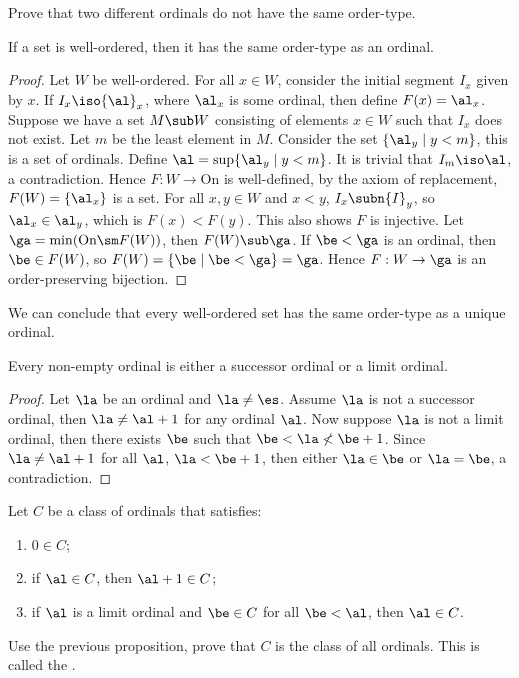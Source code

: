 \documentclass[10pt]{article}
\begin{document}
\begin{problem}
    Prove that two different ordinals do not have the same order-type.
\end{problem}
\begin{proposition}
    If a set is well-ordered, then it has the same order-type as an ordinal.
\end{proposition}
\begin{proof}
    Let $W$ be well-ordered. For all $x\in W$, consider the initial segment ${I}_{x}$ given by $x$. If ${I}_{x}\iso{\al}_{x}$, where ${\al}_{x}$ is some ordinal, then define $F(x)={\al}_{x}$. Suppose we have a set $M\sub W$ consisting of elements $x\in W$ such that ${I}_{x}$ does not exist. Let $m$ be the least element in $M$. Consider the set $\{{\al}_{y}\mid y<m\}$, this is a set of ordinals. Define $\al=\sup\{{\al}_{y}\mid y<m\}$. It is trivial that ${I}_{m}\iso\al$, a contradiction. Hence $F:W\to\text{On}$ is well-defined, by the axiom of replacement, $F(W)=\{{\al}_{x}\}$ is a set. For all $x,y\in W$ and $x<y$, ${I}_{x}\subn{I}_{y}$, so ${\al}_{x}\in{\al}_{y}$, which is $F(x)<F(y)$. This also shows $F$ is injective. Let $\ga=\min(\text{On}\sm F(W))$, then $F(W)\sub\ga$. If $\be<\ga$ is an ordinal, then $\be\in F(W)$, so $F(W)=\{\be\mid\be<\ga\}=\ga$. Hence $F:W\to\ga$ is an order-preserving bijection.
\end{proof}
\par
We can conclude that every well-ordered set has the same order-type as a unique ordinal.
\begin{proposition}
    Every non-empty ordinal is either a successor ordinal or a limit ordinal.
\end{proposition}
\begin{proof}
    Let $\la$ be an ordinal and $\la\ne\es$. Assume $\la$ is not a successor ordinal, then $\la\ne\al+1$ for any ordinal $\al$. Now suppose $\la$ is not a limit ordinal, then there exists $\be$ such that $\be<\la\nless\be+1$. Since $\la\ne\al+1$ for all $\al$, $\la<\be+1$, then either $\la\in\be$ or $\la=\be$, a contradiction.
\end{proof}
\begin{problem}
    Let $C$ be a class of ordinals that satisfies:
    \begin{enumerate}
        \item $0\in C$;
        \item if $\al\in C$, then $\al+1\in C$;
        \item if $\al$ is a limit ordinal and $\be\in C$ for all $\be<\al$, then $\al\in C$.
    \end{enumerate}
    Use the previous proposition, prove that $C$ is the class of all ordinals. This is called the .
\end{problem}
\end{document}
